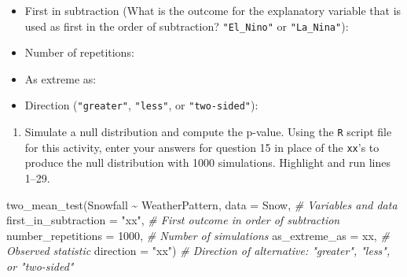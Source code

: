 \documentclass[
]{report}
\newenvironment{Shaded}{\begin{snugshade}}{\end{snugshade}}
\newcommand{\AttributeTok}[1]{\textcolor[rgb]{0.77,0.63,0.00}{#1}}
\newcommand{\CommentTok}[1]{\textcolor[rgb]{0.56,0.35,0.01}{\textit{#1}}}
\newcommand{\DecValTok}[1]{\textcolor[rgb]{0.00,0.00,0.81}{#1}}
\newcommand{\FunctionTok}[1]{\textcolor[rgb]{0.00,0.00,0.00}{#1}}
\newcommand{\NormalTok}[1]{#1}
\newcommand{\SpecialCharTok}[1]{\textcolor[rgb]{0.00,0.00,0.00}{#1}}
\newcommand{\StringTok}[1]{\textcolor[rgb]{0.31,0.60,0.02}{#1}}
\providecommand{\tightlist}{%
  \setlength{\itemsep}{0pt}\setlength{\parskip}{0pt}}
\begin{document}
\newpage

\begin{itemize}
\tightlist
\item
  First in subtraction (What is the outcome for the explanatory variable that is used as first in the order of subtraction? \texttt{"El\_Nino"} or \texttt{"La\_Nina"}):
\end{itemize}

\vspace{.2in}

\begin{itemize}
\tightlist
\item
  Number of repetitions:
\end{itemize}

\vspace{.2in}

\begin{itemize}
\tightlist
\item
  As extreme as:
\end{itemize}

\vspace{.2in}

\begin{itemize}
\tightlist
\item
  Direction (\texttt{"greater"}, \texttt{"less"}, or \texttt{"two-sided"}):
\end{itemize}

\vspace{.2in}

\begin{enumerate}
\def\labelenumi{\arabic{enumi}.}
\setcounter{enumi}{15}
\tightlist
\item
  Simulate a null distribution and compute the p-value. Using the \texttt{R} script file for this activity, enter your answers for question 15 in place of the \texttt{xx}'s to produce the null distribution with 1000 simulations. Highlight and run lines 1--29.
\end{enumerate}

\begin{Shaded}
\begin{Highlighting}[]
\FunctionTok{two\_mean\_test}\NormalTok{(Snowfall }\SpecialCharTok{\textasciitilde{}}\NormalTok{ WeatherPattern, }\AttributeTok{data =}\NormalTok{ Snow,  }\CommentTok{\# Variables and data}
         \AttributeTok{first\_in\_subtraction =} \StringTok{"xx"}\NormalTok{, }\CommentTok{\# First outcome in order of subtraction}
         \AttributeTok{number\_repetitions =} \DecValTok{1000}\NormalTok{,  }\CommentTok{\# Number of simulations}
         \AttributeTok{as\_extreme\_as =}\NormalTok{ xx,  }\CommentTok{\# Observed statistic}
         \AttributeTok{direction =} \StringTok{"xx"}\NormalTok{)  }\CommentTok{\# Direction of alternative: "greater", "less", or "two{-}sided"}
\end{Highlighting}
\end{Shaded}
\end{document}
